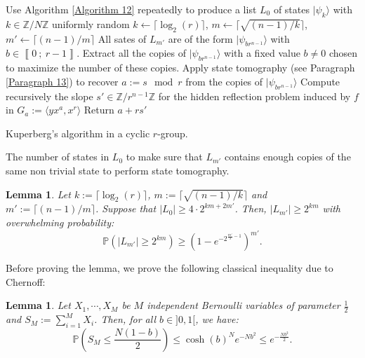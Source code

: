 \documentclass[a4paper,10pt,notitlepage]{report}
\theoremstyle{definition}
\theoremstyle{plain}
\newtheorem{Lemma}[Definition]{Lemma}
\theoremstyle{definition}
\newcommand{\Z}{\mathbb{Z}}
\renewcommand{\i}[2]{\left\llbracket #1~;~#2\right\rrbracket}
\renewcommand{\(}{\left(}
\renewcommand{\)}{\right)}
\renewcommand{\P}{\mathbb{P}}
\begin{document}
\begin{algorithm}\label{Algorithm 14}
\SetAlgoLined
{}
\KwResult{$s\in\Z/N\Z$.}

Use Algorithm \ref{Algorithm 12} repeatedly to produce a list $L_0$ of states $|\psi_k\rangle$ with $k\in\Z/N\Z$ uniformly random\;
$k\leftarrow \lceil\log_2(r)\rceil$, $m\leftarrow \lceil \sqrt{(n-1)/k}\rceil$, $m'\leftarrow\lceil (n-1)/m\rceil$\;
All sates of $L_{m'}$ are of the form $|\psi_{br^{n-1}}\rangle$ with $b\in\i{0}{r-1}$. Extract all the copies of $|\psi_{br^{n-1}}\rangle$ with a fixed value $b\neq 0$ chosen to maximize the number of these copies. \;
Apply state tomography (see Paragraph \ref{Paragraph 13}) to recover $a:=s \mod r$ from the copies of $|\psi_{br^{n-1}}\rangle$\;
Compute recursively the slope $s'\in\Z/r^{n-1}\Z$ for the hidden reflection problem induced by $f$ in $G_a:=\langle yx^a,x^r\rangle$\;
Return $a+rs'$\;

\caption{Kuperberg's algorithm in a cyclic $r$-group.}
\end{algorithm}

The number of states in $L_0$ to make sure that $L_{m'}$ contains enough copies of the same non trivial state to perform state tomography.

\begin{Lemma}\label{Lemma 21}
Let $k:=\lceil\log_2(r)\rceil$, $m:=\lceil \sqrt{(n-1)/k}\rceil$ and $m':=\lceil (n-1)/m\rceil$. Suppose that $|L_0|\geq 4\cdot 2^{km+2m'}$. Then, $|L_{m'}|\geq 2^{km}$ with overwhelming probability: 
\[\P\(|L_{m'}|\geq 2^{km}\)\geq \(1-e^{-2^{\frac{m'}{3}-1}}\)^{m'}.\]
\end{Lemma}

Before proving the lemma, we prove the following classical inequality due to Chernoff:

\begin{Lemma}
Let $X_1, \cdots, X_{M}$ be $M$ independent Bernoulli variables of parameter $\frac{1}{2}$ and $S_M:=\sum_{i=1}^M X_i$. Then, for all $b\in]0,1[$, we have:
\[\P\(S_M\leq\frac{N(1-b)}{2}\)\leq \cosh(b)^N e^{-Nb^2}\leq e^{-\frac{Nb^2}{2}}.\]
\end{Lemma}
\end{document}
